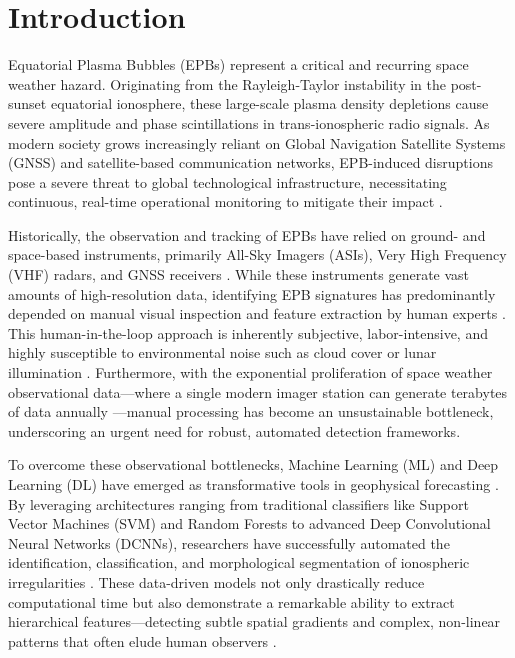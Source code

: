 \section{Introduction}\label{sec:introduction}

Equatorial Plasma Bubbles (EPBs) represent a critical and recurring space weather hazard. Originating from the Rayleigh-Taylor instability in the post-sunset equatorial ionosphere, these large-scale plasma density depletions cause severe amplitude and phase scintillations in trans-ionospheric radio signals. As modern society grows increasingly reliant on Global Navigation Satellite Systems (GNSS) and satellite-based communication networks, EPB-induced disruptions pose a severe threat to global technological infrastructure, necessitating continuous, real-time operational monitoring to mitigate their impact \cite{zhong2025automatic,okoh2025bootstrapping,githio2024machine}.

Historically, the observation and tracking of EPBs have relied on ground- and space-based instruments, primarily All-Sky Imagers (ASIs), Very High Frequency (VHF) radars, and GNSS receivers \cite{zhong2025automatic,githio2024machine,okoh2025bootstrapping}. While these instruments generate vast amounts of high-resolution data, identifying EPB signatures has predominantly depended on manual visual inspection and feature extraction by human experts \cite{okoh2025bootstrapping,zhong2025automatic}. This human-in-the-loop approach is inherently subjective, labor-intensive, and highly susceptible to environmental noise such as cloud cover or lunar illumination \cite{okoh2025bootstrapping}. Furthermore, with the exponential proliferation of space weather observational data---where a single modern imager station can generate terabytes of data annually \cite{zhong2025automatic}---manual processing has become an unsustainable bottleneck, underscoring an urgent need for robust, automated detection frameworks.

To overcome these observational bottlenecks, Machine Learning (ML) and Deep Learning (DL) have emerged as transformative tools in geophysical forecasting \cite{githio2024machine,okoh2025bootstrapping}. By leveraging architectures ranging from traditional classifiers like Support Vector Machines (SVM) and Random Forests to advanced Deep Convolutional Neural Networks (DCNNs), researchers have successfully automated the identification, classification, and morphological segmentation of ionospheric irregularities \cite{githio2024machine,zhong2025automatic,thanakulketsarat2023classification}. These data-driven models not only drastically reduce computational time but also demonstrate a remarkable ability to extract hierarchical features---detecting subtle spatial gradients and complex, non-linear patterns that often elude human observers \cite{okoh2025bootstrapping}.

